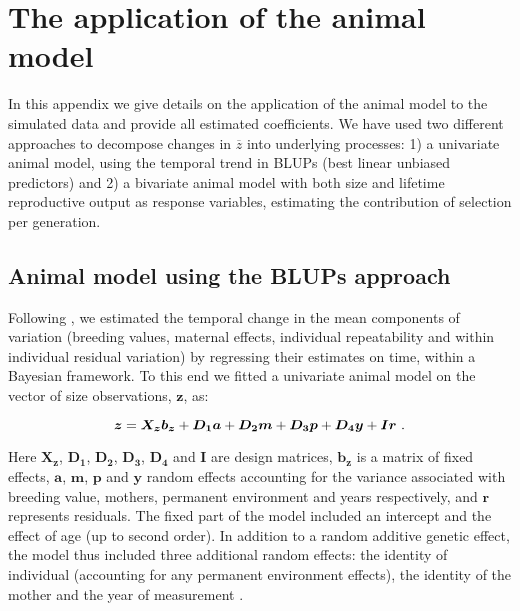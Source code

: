 \section{The application of the animal model}
\label{app:am}
In this appendix we give details on the application of the animal model to the simulated data and provide all estimated coefficients. We have used two different approaches to decompose changes in $\overline z$ into underlying processes: 1) a univariate animal model, using the temporal trend in BLUPs (best linear unbiased predictors) and 2) a bivariate animal model with both size and lifetime reproductive output as response variables, estimating the contribution of selection per generation.

\subsection{Animal model using the BLUPs approach}
Following \cite{Hadfield2010}, we estimated the temporal change in the mean components of variation (breeding values, maternal effects, individual repeatability and within individual residual variation) by regressing their estimates on time, within a Bayesian framework. 
To this end we fitted a univariate animal model on the vector of size observations, $\boldsymbol{z}$, as:

\begin{equation}
\boldsymbol{z}=\boldsymbol{X_z}\boldsymbol{b_z}+\boldsymbol{D_1a}+\boldsymbol{D_2m}+\boldsymbol{D_3p}+\boldsymbol{D_4y}+\boldsymbol{Ir} \text{ .}\\
\end{equation}

\noindent Here $\boldsymbol{X_z}$, $\boldsymbol{D_1}$, $\boldsymbol{D_2}$, $\boldsymbol{D_3}$, $\boldsymbol{D_4}$ and $\boldsymbol{I}$ are design matrices, $\boldsymbol{b_z}$ is a matrix of fixed effects, $\boldsymbol{a}$, $\boldsymbol{m}$, $\boldsymbol{p}$ and $\boldsymbol{y}$ random effects accounting for the variance associated with breeding value, mothers, permanent environment and years respectively, and $\boldsymbol{r}$ represents residuals. The fixed part of the model included an intercept and the effect of age (up to second order). In addition to a random additive genetic effect, the model thus included three additional random effects: the identity of individual (accounting for any permanent environment effects), the identity of the mother and the year of measurement \citep{Kruuk2004}.


